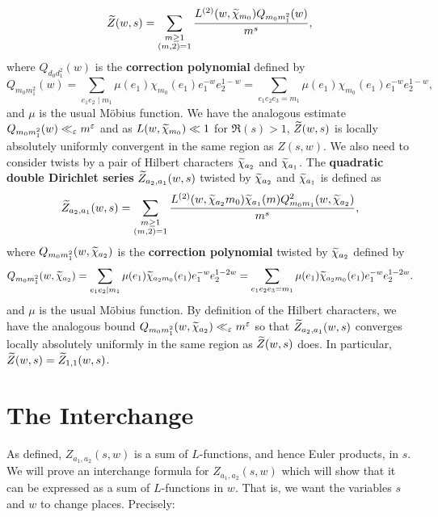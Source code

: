 \documentclass[12pt,reqno,oneside]{amsart}
\begin{document}
    \[
        \widetilde{Z}(w,s) = \sum_{\substack{m \ge 1 \\ (m,2) = 1}}\frac{L^{(2)}(w,\widetilde{\chi}_{m_{0}})Q_{m_{0}m_{1}^{2}}(w)}{m^{s}},
    \]
    where $Q_{d_{0}d_{1}^{2}}(w)$ is the \textbf{correction polynomial} defined by
    \[
        Q_{m_{0}m_{1}^{2}}(w) = \sum_{e_{1}e_{2} \mid m_{1}}\mu(e_{1})\chi_{m_{0}}(e_{1})e_{1}^{-w}e_{2}^{1-w} = \sum_{e_{1}e_{2}e_{3} = m_{1}}\mu(e_{1})\chi_{m_{0}}(e_{1})e_{1}^{-w}e_{2}^{1-w},
    \]
    and $\mu$ is the usual M\"obius function. We have the analogous estimate $Q_{m_{0}m_{1}^{2}}(w) \ll_{\varepsilon} m^{\varepsilon}$ and as $L(w,\widetilde{\chi}_{m_{0}}) \ll 1$ for $\Re(s) > 1$, $\widetilde{Z}(w,s)$ is locally absolutely uniformly convergent in the same region as $Z(s,w)$. We also need to consider twists by a pair of Hilbert characters $\widetilde{\chi}_{a_{2}}$ and $\widetilde{\chi}_{a_{1}}$. The \textbf{quadratic double Dirichlet series} $\widetilde{Z}_{a_{2},a_{1}}(w,s)$ twisted by $\widetilde{\chi}_{a_{2}}$ and $\widetilde{\chi}_{a_{1}}$ is defined as
    \[
        \widetilde{Z}_{a_{2},a_{1}}(w,s) = \sum_{\substack{m \ge 1 \\ (m,2) = 1}}\frac{L^{(2)}(w,\widetilde{\chi}_{a_{2}}m_{0})\widetilde{\chi}_{a_{1}}(m)Q_{m_{0}m_{1}}^{2}(w,\widetilde{\chi}_{a_{2}})}{m^{s}},
    \]
    where $Q_{m_{0}m_{1}^{2}}(w,\widetilde{\chi}_{a_{2}})$ is the \textbf{correction polynomial} twisted by $\widetilde{\chi}_{a_{2}}$ defined by
    \[
        Q_{m_{0}m_{1}^{2}}(w,\widetilde{\chi}_{a_{2}}) = \sum_{e_{1}e_{2} \mid m_{1}}\mu(e_{1})\widetilde{\chi}_{a_{2}m_{0}}(e_{1})e_{1}^{-w}e_{2}^{1-2w} = \sum_{e_{1}e_{2}e_{3} = m_{1}}\mu(e_{1})\widetilde{\chi}_{a_{2}m_{0}}(e_{1})e_{1}^{-w}e_{2}^{1-2w}.
    \]
    and $\mu$ is the usual M\"obius function. By definition of the Hilbert characters, we have the analogous bound $Q_{m_{0}m_{1}^{2}}(w,\widetilde{\chi}_{a_{2}}) \ll_{\varepsilon} m^{\varepsilon}$ so that $\widetilde{Z}_{a_{2},a_{1}}(w,s)$ converges locally absolutely uniformly in the same region as $\widetilde{Z}(w,s)$ does. In particular, $\widetilde{Z}(w,s) = \widetilde{Z}_{1,1}(w,s)$.
\section*{The Interchange}
    As defined, $Z_{a_{1},a_{2}}(s,w)$ is a sum of $L$-functions, and hence Euler products, in $s$. We will prove an interchange formula for $Z_{a_{1},a_{2}}(s,w)$ which will show that it can be expressed as a sum of $L$-functions in $w$. That is, we want the variables $s$ and $w$ to change places. Precisely:
\end{document}
